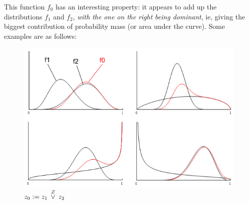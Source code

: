
This function $f_0$ has an interesting property:  it appears to add up the distributions $f_1$ and $f_2$, \textit{with the one on the right being dominant}, ie, giving the biggest contribution of probability mass (or area under the curve).  Some examples are as follows:
\begin{figure}[H]
\centering
\includegraphics[scale=0.8]{A-ZOR-B-examples.png}
\caption{$z_0 := z_1 \, \stackrel{Z}{\vee} \, z_2$}
\end{figure}

